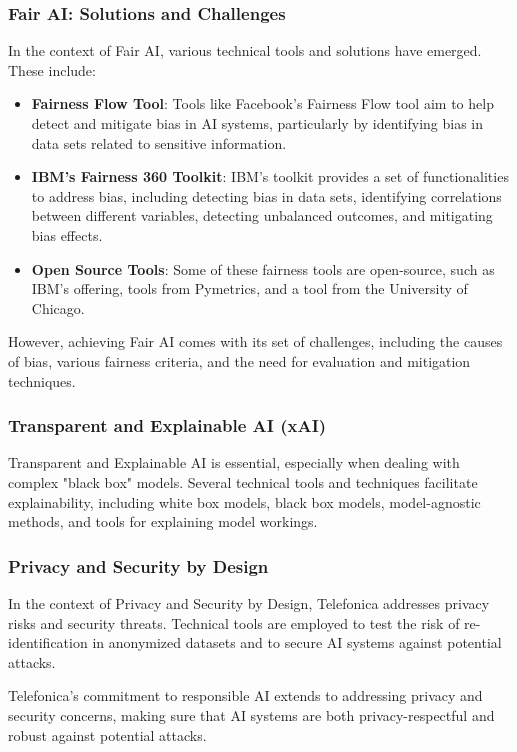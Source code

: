 \documentclass{article}
\begin{document}
\subsubsection{Fair AI: Solutions and Challenges}
In the context of Fair AI, various technical tools and solutions have emerged. These include:
\begin{itemize}
    \item \textbf{Fairness Flow Tool}: Tools like Facebook's Fairness Flow tool aim to help detect and mitigate bias in AI systems, particularly by identifying bias in data sets related to sensitive information.
    \item \textbf{IBM's Fairness 360 Toolkit}: IBM's toolkit provides a set of functionalities to address bias, including detecting bias in data sets, identifying correlations between different variables, detecting unbalanced outcomes, and mitigating bias effects.
    \item \textbf{Open Source Tools}: Some of these fairness tools are open-source, such as IBM's offering, tools from Pymetrics, and a tool from the University of Chicago.

\end{itemize}

However, achieving Fair AI comes with its set of challenges, including the causes of bias, various fairness criteria, and the need for evaluation and mitigation techniques.

\subsubsection{Transparent and Explainable AI (xAI)}
Transparent and Explainable AI is essential, especially when dealing with complex "black box" models. Several technical tools and techniques facilitate explainability, including white box models, black box models, model-agnostic methods, and tools for explaining model workings.

\subsubsection{Privacy and Security by Design}
In the context of Privacy and Security by Design, Telefonica addresses privacy risks and security threats. Technical tools are employed to test the risk of re-identification in anonymized datasets and to secure AI systems against potential attacks.

Telefonica's commitment to responsible AI extends to addressing privacy and security concerns, making sure that AI systems are both privacy-respectful and robust against potential attacks.
\end{document}
